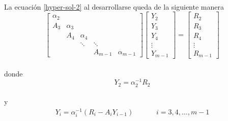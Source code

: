 \documentclass[letterpaper, openright, 12pt]{book}
\begin{document}
\paragraph*{}
        La ecuación \ref{hyper-sol-2} al desarrollarse queda de la siguiente manera
        \begin{equation}
            \begin{bmatrix}
                \alpha_2\\
                A_3 & \alpha_3\\
                & A_4 & \alpha_4\\
                & & \ddots & \ddots\\
                & & & A_{m-1} & \alpha_{m-1}
            \end{bmatrix}
            \begin{bmatrix}
                Y_2\\
                Y_3\\
                Y_4\\
                \vdots\\
                Y_{m-1}
            \end{bmatrix}
            =
            \begin{bmatrix}
                R_2\\
                R_3\\
                R_4\\
                \vdots\\
                R_{m-1}
            \end{bmatrix}
        \end{equation}\\
        donde
        \begin{equation}
            Y_2 = \alpha_{2}^{-1} R_2
        \end{equation}\\
        y
        \begin{align}
            Y_i = \alpha_{i}^{-1} \left( R_i - A_i Y_{i-1} \right) &&&& i = 3, 4, \dots, m-1
        \end{align}
\end{document}
